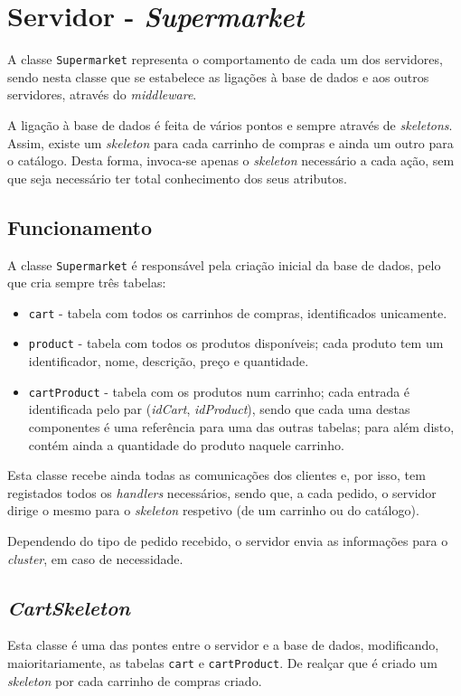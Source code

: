 \documentclass[a4paper]{report}
\begin{document}
{	\section{Servidor - \textit{Supermarket}} \label{sec:Server}
		A classe \texttt{Supermarket} representa o comportamento de cada um dos servidores, sendo nesta classe que se estabelece as ligações à base de dados e aos outros servidores, através do \textit{middleware}.
		
		A ligação à base de dados é feita de vários pontos e sempre através de \textit{skeletons}. Assim, existe um \textit{skeleton} para cada carrinho de compras e ainda um outro para o catálogo.
		Desta forma, invoca-se apenas o \textit{skeleton} necessário a cada ação, sem que seja necessário ter total conhecimento dos seus atributos.

		\subsection{Funcionamento} \label{subsec:ServerWorking}
			A classe \texttt{Supermarket} é responsável pela criação inicial da base de dados, pelo que cria sempre três tabelas:
			\begin{itemize}
				\item \texttt{cart} - tabela com todos os carrinhos de compras, identificados unicamente.
				\item \texttt{product} - tabela com todos os produtos disponíveis; cada produto tem um identificador, nome, descrição, preço e quantidade.
				\item \texttt{cartProduct} - tabela com os produtos num carrinho; cada entrada é identificada pelo par (\textit{idCart}, \textit{idProduct}), sendo que cada uma destas componentes é uma referência para uma das outras tabelas; para além disto, contém ainda a quantidade do produto naquele carrinho.
			\end{itemize}
			
			Esta classe recebe ainda todas as comunicações dos clientes e, por isso, tem registados todos os \textit{handlers} necessários, sendo que, a cada pedido, o servidor dirige o mesmo para o \textit{skeleton} respetivo (de um carrinho ou do catálogo).

			Dependendo do tipo de pedido recebido, o servidor envia as informações para o \textit{cluster}, em caso de necessidade.

		\subsection{\textit{CartSkeleton}} \label{subsec:ServerCartSkeleton}
			Esta classe é uma das pontes entre o servidor e a base de dados, modificando, maioritariamente, as tabelas \texttt{cart} e \texttt{cartProduct}. De realçar que é criado um \textit{skeleton} por cada carrinho de compras criado.

}
\end{document}
